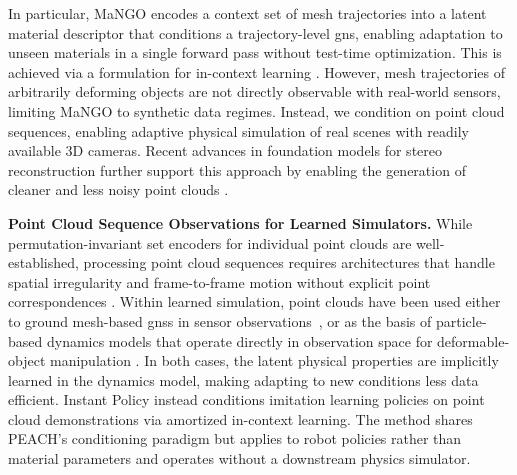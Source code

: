 In particular, MaNGO \citep{dahlinger2025mango} encodes a context set of mesh trajectories into a latent material descriptor that conditions a trajectory-level \gls{gns}, enabling adaptation to unseen materials in a single forward pass without test-time optimization. 
This is achieved via a  formulation for in-context learning \citep{garnelo_conditional_2018}.
However, mesh trajectories of arbitrarily deforming objects are not directly observable with real-world sensors, limiting MaNGO to synthetic data regimes.
Instead, we condition on point cloud sequences, enabling adaptive physical simulation of real scenes with readily available 3D cameras.
Recent advances in foundation models for stereo reconstruction further support this approach by enabling the generation of cleaner and less noisy point clouds \citep{wen2025stereo}.



\textbf{Point Cloud Sequence Observations for Learned Simulators.}
While permutation-invariant set encoders for individual point clouds \citep{qi2016pointnet, ruizhongtai2017pointnet, pointMAE, pointBERT, pointGPT} are well-established, processing point cloud sequences requires architectures that handle spatial irregularity and frame-to-frame motion without explicit point correspondences \citep{meteornet19, fan2021pstnet}.
Within learned simulation, point clouds have been used either to ground mesh-based \glspl{gns} in sensor observations~\citep{linkerhagner2023grounding}, or as the basis of particle-based dynamics models that operate directly in observation space for deformable-object manipulation \citep{li2019learning, robocook23}.
In both cases, the latent physical properties are implicitly learned in the dynamics model, making adapting to new conditions less data efficient.
Instant Policy \citep{vosylius2024instantpolicyincontextimitation} instead conditions imitation learning policies on point cloud demonstrations via amortized in-context learning. The method shares PEACH's conditioning paradigm but applies to robot policies rather than material parameters and operates without a downstream physics simulator.

